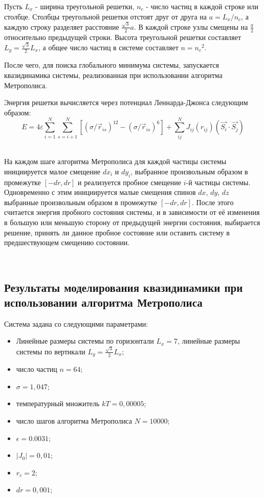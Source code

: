 \documentclass[14pt,a4paper,report]{ncc}
\begin{document}
Пусть $L_x$ - ширина треугольной решетки, $n_c$ - число частиц в каждой строке или столбце. Столбцы треугольной решетки отстоят друг от друга на $a={L_x}/{n_c}$, а каждую строку разделяет расстояние ${\frac{\sqrt{3}}{2}} a$. В каждой строке узлы смещены на $\frac{a}{2}$ относительно предыдущей строки. Высота треугольной решетки составляет $L_y={\frac{\sqrt{3}}{2}} L_x$, а общее число частиц в системе составляет $n={n_c}^2$. 
\

После чего, для поиска глобального минимума системы, запускается квазидинамика системы, реализованная при использовании алгоритма Метрополиса.
\ 

Энергия решетки вычисляется через потенциал Леннарда-Джонса следующим образом:
\begin{equation}
E=4 \varepsilon \sum\limits_{i=1}^N \sum\limits_{s=i+1}^N{ [(\sigma/\vec{r}_{is})^{12} - (\sigma/\vec{r}_{is})^{6}]+\sum\limits_{ij}^N{J_{ij}(r_{ij})(\vec{S_i} \cdot \vec{S_j})}  }
\end{equation}
\

На каждом шаге алгоритма Метрополиса для каждой частицы системы инициируется малое смещение $dx_i$ и $dy_i$, выбранное произвольным образом в промежутке $[-dr, dr]$ и реализуется пробное смещение $i$-й частицы системы. Одновременно с этим инициируется малые смещения спинов $dx$, $dy$, $dz$ выбранные произвольным образом в промежутке $[-dr, dr]$. После этого считается энергия пробного состояния системы, и в зависимости от её изменения в большую или меньшую сторону от предыдущей энергии состояния, выбирается решение, принять ли данное пробное состояние или оставить систему в предшествующем смещению состоянии.

\

\subsection{Результаты моделирования квазидинамики при использовании алгоритма Метрополиса}
Система задана со следующими параметрами:
\begin{itemize}
\item Линейные размеры системы по горизонтали $L_x=7$, линейные размеры системы по вертикали $L_y=\frac{\sqrt{3}}{2}L_x$;
\item число частиц $n=64$;
\item $\sigma=1,047$;
\item температурный множитель $kT=0,00005$;
\item число шагов алгоритма Метрополиса $N=10000$;
\item $\epsilon=0.0031$;
\item $|J_0|=0,01$;
\item $r_c=2$;
\item $dr=0,001$;
\end{itemize}
\end{document}
